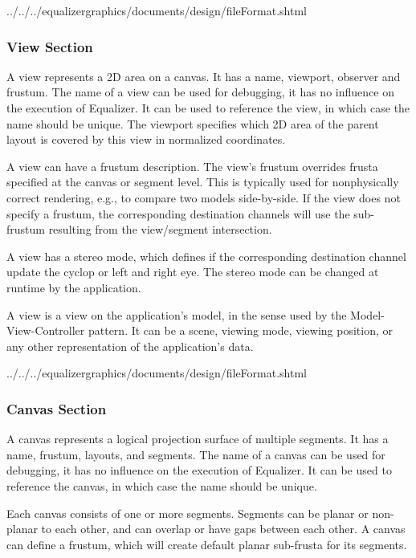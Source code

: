 \documentclass[10pt,a4]{scrartcl}
\begin{document}
{\footnotesize
  {../../../equalizergraphics/documents/design/fileFormat.shtml}}

\subsubsection{View Section}

A view represents a 2D area on a canvas. It has a name, viewport,
observer and frustum. The name of a view can be used for debugging, it
has no influence on the execution of Equalizer. It can be used to
reference the view, in which case the name should be unique. The viewport
specifies which 2D area of the parent layout is covered by this view in
normalized coordinates.

A view can have a frustum description. The view's frustum overrides
frusta specified at the canvas or segment level. This is typically used
for nonphysically correct rendering, e.g., to compare two models
side-by-side. If the view does not specify a frustum, the corresponding
destination channels will use the sub-frustum resulting from the
view/segment intersection.

A view has a stereo mode, which defines if the corresponding destination channel
update the cyclop or left and right eye. The stereo mode can be changed at
runtime by the application.

A view is a view on the application's model, in the sense used by the
Model-View-Controller pattern. It can be a scene, viewing mode, viewing
position, or any other representation of the application's data.

{\footnotesize
  {../../../equalizergraphics/documents/design/fileFormat.shtml}}

\subsubsection{Canvas Section}

A canvas represents a logical projection surface of multiple
segments. It has a name, frustum, layouts, and segments. The name of a
canvas can be used for debugging, it has no influence on the execution
of Equalizer. It can be used to reference the canvas, in which case the
name should be unique.

Each canvas consists of one or more segments. Segments can be planar or
non-planar to each other, and can overlap or have gaps between each
other. A canvas can define a frustum, which will create default planar
sub-frusta for its segments.
\end{document}
